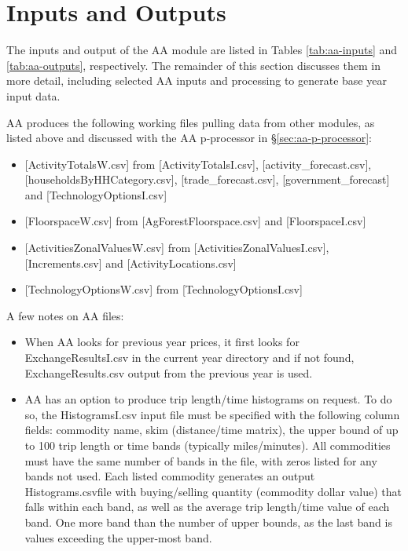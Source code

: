 \section{Inputs and Outputs}\label{sec:aa-inputs-outputs}
The inputs and output of the AA module are listed in Tables \ref{tab:aa-inputs} and \ref{tab:aa-outputs}, respectively. The remainder of this section discusses them in more detail, including selected AA inputs and processing to generate base year input data.


AA produces the following working files pulling data from other modules, as listed above and 
discussed with the AA p-processor in \S\ref{sec:aa-p-processor}:
\begin{itemize}
\item {[ActivityTotalsW.csv] from [ActivityTotalsI.csv], [activity\_forecast.csv], [householdsByHHCategory.csv], [trade\_forecast.csv], [government\_forecast] and [TechnologyOptionsI.csv]}
\item {[FloorspaceW.csv] from [AgForestFloorspace.csv] and [FloorspaceI.csv]}
\item {[ActivitiesZonalValuesW.csv] from [ActivitiesZonalValuesI.csv], [Increments.csv] and [ActivityLocations.csv]}
\item {[TechnologyOptionsW.csv] from [TechnologyOptionsI.csv]}
\end{itemize}

\noindent A few notes on AA files:
\begin{itemize}
\item When AA looks for previous year prices, it first looks for ExchangeResultsI.csv in the current year 
directory and if not found, ExchangeResults.csv output from the previous year is used.
\item AA has an option to produce trip length/time histograms on request. To do so, the HistogramsI.csv input file must be specified with the following column fields: commodity name, skim (distance/time matrix), the upper bound of up to 100 trip length or time bands (typically miles/minutes). All commodities must have the same number of bands in the file, with zeros listed for any bands not used. Each listed commodity generates an output Histograms.csvfile with buying/selling quantity (commodity dollar value) that falls within each band, as well as the average trip length/time value of each band. One more band than the number of upper bounds, as the last band is values exceeding the upper-most band.
\end{itemize}

